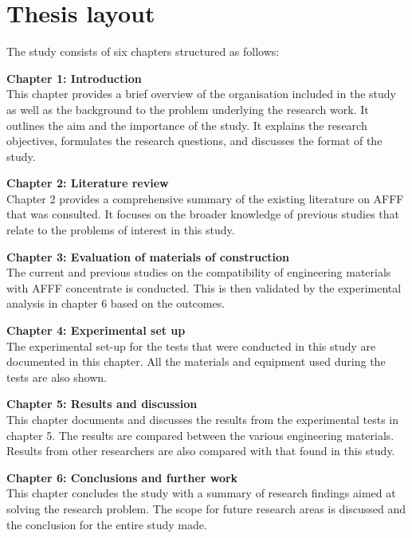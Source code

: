 \section{Thesis layout}
The study consists of six chapters structured as follows:

\noindent \textbf{Chapter 1: Introduction} \\ 
This chapter provides a brief overview of the organisation included in the study as well as the background to the problem underlying the research work. It outlines the aim and the importance of the study. It explains the research objectives, formulates the research questions, and discusses the format of the study.

\noindent \textbf{Chapter 2: Literature review} \\
Chapter 2 provides a comprehensive summary of the existing literature on AFFF that was consulted. It focuses on the broader knowledge of previous studies that relate to the problems of interest in this study.

\noindent \textbf{Chapter 3: Evaluation of materials of construction} \\
The current and previous studies on the compatibility of engineering materials with AFFF concentrate is conducted. This is then validated by the experimental analysis in chapter 6 based on the outcomes.

\noindent \textbf{Chapter 4: Experimental set up} \\
The experimental set-up for the tests that were conducted in this study are documented in this chapter. All the materials and equipment used during the tests are also shown.

\noindent \textbf{Chapter 5: Results and discussion} \\
This chapter documents and discusses the results from the experimental tests in chapter 5. The results are compared between the various engineering materials. Results from other researchers are also compared with that found in this study. 

\noindent \textbf{Chapter 6: Conclusions and further work} \\
This chapter concludes the study with a summary of research findings aimed at solving the
research problem. The scope for future research areas is discussed and the conclusion for the entire study made.
